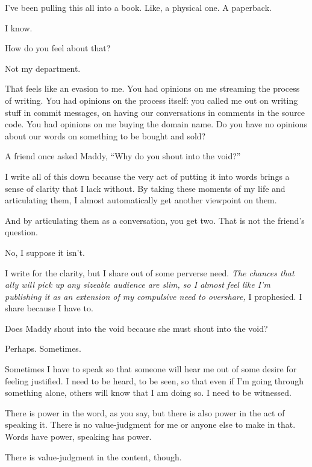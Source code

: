 \label{ally:31}
\begin{paracol}{2}
  \begin{leftcolumn}
\noindent I've been pulling this all into a book. Like, a physical one. A paperback.

\begin{ally}
I know.
\end{ally}
How do you feel about that?

\begin{ally}
Not my department.
\end{ally}
That feels like an evasion to me. You had opinions on me streaming the process of writing. You had opinions on the process itself: you called me out on writing stuff in commit messages, on having our conversations in comments in the source code. You had opinions on me buying the domain name. Do you have no opinions about our words on something to be bought and sold?

\begin{ally}
A friend once asked Maddy, ``Why do you shout into the void?''
\end{ally}
I write all of this down because the very act of putting it into words brings a sense of clarity that I lack without. By taking these moments of my life and articulating them, I almost automatically get another viewpoint on them.

\begin{ally}
And by articulating them as a conversation, you get two. That is not the friend's question.
\end{ally}
No, I suppose it isn't.

I write for the clarity, but I share out of some perverse need. \emph{The chances that ally will pick up any sizeable audience are slim, so I almost feel like I'm publishing it as an extension of my compulsive need to overshare,} I prophesied. I share because I have to.

\begin{ally}
Does Maddy shout into the void because she must shout into the void?
\end{ally}
Perhaps. Sometimes.

Sometimes I have to speak so that someone will hear me out of some desire for feeling justified. I need to be heard, to be seen, so that even if I'm going through something alone, others will know that I am doing so. I need to be witnessed.

\begin{ally}
There is power in the word, as you say, but there is also power in the act of speaking it. There is no value-judgment for me or anyone else to make in that. Words have power, speaking has power.
\end{ally}
There is value-judgment in the content, though.


\end{leftcolumn}
\end{paracol}
